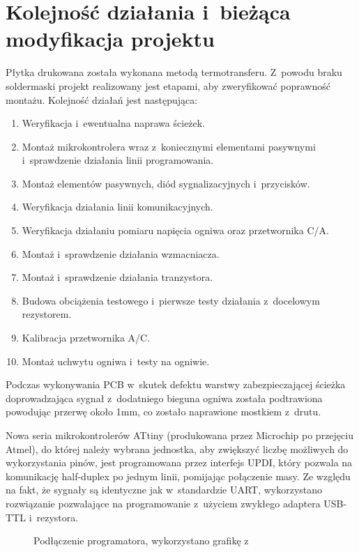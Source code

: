 \documentclass[polish,engineer]{polsl-msth}
\begin{document}
\section{Kolejność działania i~bieżąca modyfikacja projektu\label{section:przerobki}}
Płytka drukowana została wykonana metodą termotransferu. Z~powodu braku soldermaski projekt realizowany jest etapami, aby zweryfikować poprawność montażu. Kolejność działań jest następująca:
\begin{enumerate}
    \item Weryfikacja i~ewentualna naprawa ścieżek.
    \item Montaż mikrokontrolera wraz z~koniecznymi elementami pasywnymi i~sprawdzenie działania linii programowania.
    \item Montaż elementów pasywnych, diód sygnalizacyjnych i~przycisków.
    \item Weryfikacja działania linii komunikacyjnych.
    \item Weryfikacja działaniu pomiaru napięcia ogniwa oraz przetwornika C/A.
    \item Montaż i~sprawdzenie działania wzmacniacza.
    \item Montaż i~sprawdzenie działania tranzystora.
    \item Budowa obciążenia testowego i~pierwsze testy działania z~docelowym rezystorem.
    \item Kalibracja przetwornika A/C.
    \item Montaż uchwytu ogniwa i~testy na ogniwie.
\end{enumerate}
Podczas wykonywania PCB w~skutek defektu warstwy zabezpieczającej ścieżka doprowadzająca sygnał z~dodatniego bieguna ogniwa została podtrawiona powodując przerwę około 1mm, co zostało naprawione mostkiem z~drutu.

Nowa seria mikrokontrolerów ATtiny (produkowana przez Microchip po przejęciu Atmel), do której należy wybrana jednostka, aby zwiększyć liczbę możliwych do wykorzystania pinów, jest programowana przez interfejs UPDI, który pozwala na komunikację half-duplex po jednym linii, pomijając połączenie masy. Ze względu na fakt, że sygnały są identyczne jak w~standardzie UART, wykorzystano rozwiązanie pozwalające na programowanie z~użyciem zwykłego adaptera USB-TTL i~rezystora\cite{pyupdi}.
\begin{figure}[hbtp]
\centering
     \caption{Podłączenie programatora, wykorzystano grafikę z~\cite{pyupdi}\label{img:pyupdi}}
\end{figure}
\end{document}
